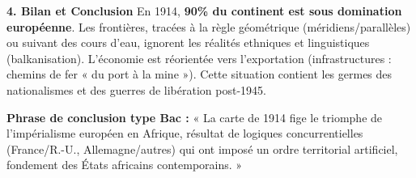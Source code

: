 \documentclass[11pt]{article}
\newcommand{\cle}[1]{{\popxbold\color{popdark}#1}}
\begin{document}
\begin{exoresolu}
\textbf{4. Bilan et Conclusion}
En 1914, \textbf{90\% du continent est sous domination européenne}. Les frontières, tracées à la règle géométrique (méridiens/parallèles) ou suivant des cours d'eau, ignorent les réalités ethniques et linguistiques (\cle{balkanisation}). L'économie est réorientée vers l'exportation (infrastructures : chemins de fer « du port à la mine »). Cette situation contient les germes des nationalismes et des guerres de libération post-1945.

\textbf{Phrase de conclusion type Bac :} « La carte de 1914 fige le triomphe de l'impérialisme européen en Afrique, résultat de logiques concurrentielles (France/R.-U., Allemagne/autres) qui ont imposé un ordre territorial artificiel, fondement des États africains contemporains. »
\end{exoresolu}
\end{document}
